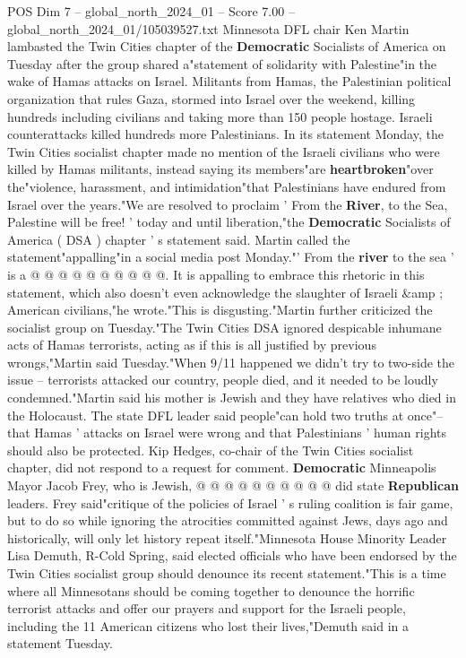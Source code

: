 \begin{textsample}{POS Dim 7 – global\_north\_2024\_01 – Score 7.00 – global\_north\_2024\_01/105039527.txt}  \label{ex:f7_pos_194}
Minnesota DFL chair Ken Martin lambasted the Twin Cities chapter of the \textbf{Democratic} Socialists of America on Tuesday after the group shared a"statement of solidarity with Palestine"in the wake of Hamas attacks on Israel.
Militants from Hamas, the Palestinian political organization that rules Gaza, stormed into Israel over the weekend, killing hundreds including civilians and taking more than 150 people hostage.
Israeli counterattacks killed hundreds more Palestinians.
In its statement Monday, the Twin Cities socialist chapter made no mention of the Israeli civilians who were killed by Hamas militants, instead saying its members"are \textbf{heartbroken}"over the"violence, harassment, and intimidation"that Palestinians have endured from Israel over the years."We are resolved to proclaim ' From the \textbf{River}, to the Sea, Palestine will be free! ' today and until liberation,"the \textbf{Democratic} Socialists of America ( DSA ) chapter ' s statement said.
Martin called the statement"appalling"in a social media post Monday."' From the \textbf{river} to the sea ' is a @ @ @ @ @ @ @ @ @ @.
It is appalling to embrace this rhetoric in this statement, which also doesn't even acknowledge the slaughter of Israeli \&amp ; American civilians,"he wrote."This is disgusting."Martin further criticized the socialist group on Tuesday."The Twin Cities DSA ignored despicable inhumane acts of Hamas terrorists, acting as if this is all justified by previous wrongs,"Martin said Tuesday."When 9/11 happened we didn't try to two-side the issue -- terrorists attacked our country, people died, and it needed to be loudly condemned."Martin said his mother is Jewish and they have relatives who died in the Holocaust.
The state DFL leader said people"can hold two truths at once"-- that Hamas ' attacks on Israel were wrong and that Palestinians ' human rights should also be protected.
Kip Hedges, co-chair of the Twin Cities socialist chapter, did not respond to a request for comment. \textbf{Democratic} Minneapolis Mayor Jacob Frey, who is Jewish, @ @ @ @ @ @ @ @ @ @ did state \textbf{Republican} leaders.
Frey said"critique of the policies of Israel ' s ruling coalition is fair game, but to do so while ignoring the atrocities committed against Jews, days ago and historically, will only let history repeat itself."Minnesota House Minority Leader Lisa Demuth, R-Cold Spring, said elected officials who have been endorsed by the Twin Cities socialist group should denounce its recent statement."This is a time where all Minnesotans should be coming together to denounce the horrific terrorist attacks and offer our prayers and support for the Israeli people, including the 11 American citizens who lost their lives,"Demuth said in a statement Tuesday.

\end{textsample}
